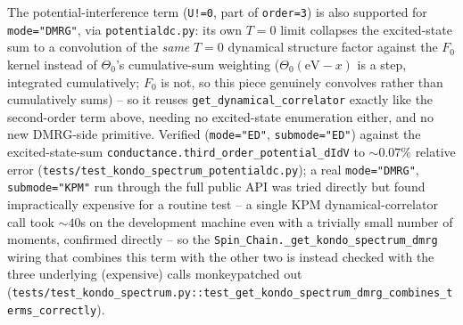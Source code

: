 \documentclass[11pt]{article}
\begin{document}
The potential-interference term (\texttt{U!=0}, part of
\texttt{order=3}) is also supported for \texttt{mode="DMRG"}, via
\texttt{potentialdc.py}: its own $T=0$ limit collapses the excited-state
sum to a convolution of the \emph{same} $T=0$ dynamical structure factor
against the $F_0$ kernel instead of $\Theta_0$'s cumulative-sum
weighting ($\Theta_0(\mathrm{eV}-x)$ is a step, integrated cumulatively;
$F_0$ is not, so this piece genuinely convolves rather than cumulatively
sums) -- so it reuses \texttt{get\_dynamical\_correlator} exactly like
the second-order term above, needing no excited-state enumeration
either, and no new DMRG-side primitive. Verified (\texttt{mode="ED"},
\texttt{submode="ED"}) against the excited-state-sum
\texttt{conductance.third\_order\_potential\_dIdV} to $\sim0.07\%$
relative error (\texttt{tests/test\_kondo\_spectrum\allowbreak\_potentialdc.py}); a
real \texttt{mode="DMRG"}, \texttt{submode="KPM"} run through the full
public API was tried directly but found impractically expensive for a
routine test -- a single KPM dynamical-correlator call took $\sim40$s on
the development machine even with a trivially small number of moments,
confirmed directly -- so the
\texttt{Spin\_Chain.\_get\_kondo\_spectrum\_dmrg} wiring that combines
this term with the other two is instead checked with the three
underlying (expensive) calls monkeypatched out
(\texttt{tests/test\_kondo\_spectrum.py::\allowbreak test\_get\_kondo\_spectrum\_dmrg\allowbreak\_combines\_terms\_correctly}).
\end{document}
